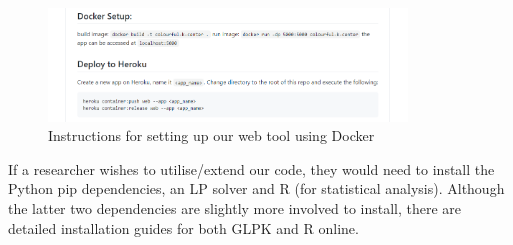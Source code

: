 \begin{figure}[H]
    \centering
    \includegraphics[width=0.85\textwidth]{images/docker_setup.png}
    \caption{Instructions for setting up our web tool using Docker}
    \label{fig:docker_setup}
\end{figure}

If a researcher wishes to utilise/extend our code, they would need to install the Python pip dependencies, an LP solver and R (for statistical analysis). Although the latter two dependencies are slightly more involved to install, there are detailed installation guides for both GLPK and R online.